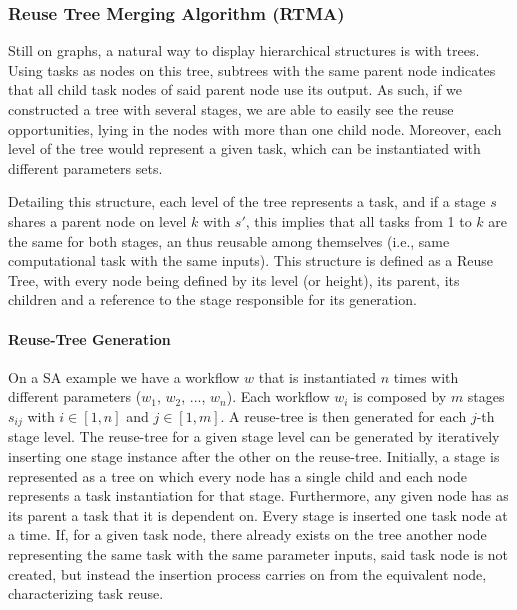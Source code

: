 


\subsubsection{Reuse Tree Merging Algorithm (RTMA)}
\label{sec:rtma}

Still on graphs, a natural way to display hierarchical structures is with trees. Using tasks as nodes on this tree, subtrees with the same parent node indicates that all child task nodes of said parent node use its output. As such, if we constructed a tree with several stages, we are able to easily see the reuse opportunities, lying in the nodes with more than one child node. Moreover, each level of the tree would represent a given task, which can be instantiated with different parameters sets. 

Detailing this structure, each level of the tree represents a task, and if a stage $s$ shares a parent node on level $k$ with $s'$, this implies that all tasks from 1 to $k$ are the same for both stages, an thus reusable among themselves (i.e., same computational task with the same inputs). This structure is defined as a Reuse Tree, with every node being defined by its level (or height), its parent, its children and a reference to the stage responsible for its generation.

\paragraph{Reuse-Tree Generation}

On a SA example we have a workflow $w$ that is instantiated $n$ times with different parameters ($w_1$, $w_2$, ..., $w_n$). Each workflow $w_i$ is composed by $m$ stages $s_{ij}$ with $i \in [1,n]$ and $j \in [1,m]$. A reuse-tree is then generated for each $j$-th stage level. The reuse-tree for a given stage level can be generated by iteratively inserting one stage instance after the other on the reuse-tree. Initially, a stage is represented as a tree on which every node has a single child and each node represents a task instantiation for that stage. Furthermore, any given node has as its parent a task that it is dependent on. Every stage is inserted one task node at a time. If, for a given task node, there already exists on the tree another node representing the same task with the same parameter inputs, said task node is not created, but instead the insertion process carries on from the equivalent node, characterizing task reuse.

